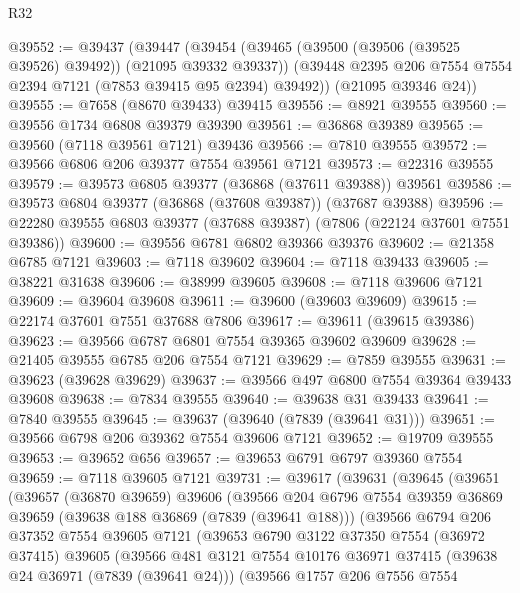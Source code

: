 \begin{lexlean}{R32}
\begin{coremodule}
@39552 := @39437
    (@39447
      (@39454
        (@39465 (@39500 (@39506 (@39525 @39526) @39492)) (@21095 @39332 @39337))
        (@39448 @2395 @206 @7554 @7554 @2394 @7121 (@7853 @39415 @95 @2394) @39492))
      (@21095 @39346 @24))
@39555 := @7658 (@8670 @39433) @39415
@39556 := @8921 @39555
@39560 := @39556 @1734 @6808 @39379 @39390
@39561 := @36868 @39389
@39565 := @39560 (@7118 @39561 @7121) @39436
@39566 := @7810 @39555
@39572 := @39566 @6806 @206 @39377 @7554 @39561 @7121
@39573 := @22316 @39555
@39579 := @39573 @6805 @39377 (@36868 (@37611 @39388)) @39561
@39586 := @39573 @6804 @39377 (@36868 (@37608 @39387)) (@37687 @39388)
@39596 := @22280 @39555 @6803 @39377 (@37688 @39387) (@7806 (@22124 @37601 @7551 @39386))
@39600 := @39556 @6781 @6802 @39366 @39376
@39602 := @21358 @6785 @7121
@39603 := @7118 @39602
@39604 := @7118 @39433
@39605 := @38221 @31638
@39606 := @38999 @39605
@39608 := @7118 @39606 @7121
@39609 := @39604 @39608
@39611 := @39600 (@39603 @39609)
@39615 := @22174 @37601 @7551 @37688 @7806
@39617 := @39611 (@39615 @39386)
@39623 := @39566 @6787 @6801 @7554 @39365 @39602 @39609
@39628 := @21405 @39555 @6785 @206 @7554 @7121
@39629 := @7859 @39555
@39631 := @39623 (@39628 @39629)
@39637 := @39566 @497 @6800 @7554 @39364 @39433 @39608
@39638 := @7834 @39555
@39640 := @39638 @31 @39433
@39641 := @7840 @39555
@39645 := @39637 (@39640 (@7839 (@39641 @31)))
@39651 := @39566 @6798 @206 @39362 @7554 @39606 @7121
@39652 := @19709 @39555
@39653 := @39652 @656
@39657 := @39653 @6791 @6797 @39360 @7554
@39659 := @7118 @39605 @7121
@39731 := @39617
    (@39631
      (@39645
        (@39651
          (@39657
            (@36870 @39659)
            @39606
            (@39566
              @204
              @6796
              @7554
              @39359
              @36869
              @39659
              (@39638 @188 @36869 (@7839 (@39641 @188)))
              (@39566
                @6794
                @206
                @37352
                @7554
                @39605
                @7121
                (@39653
                  @6790
                  @3122
                  @37350
                  @7554
                  (@36972 @37415)
                  @39605
                  (@39566
                    @481
                    @3121
                    @7554
                    @10176
                    @36971
                    @37415
                    (@39638 @24 @36971 (@7839 (@39641 @24)))
                    (@39566
                      @1757
                      @206
                      @7556
                      @7554

\end{coremodule}
\end{lexlean}
